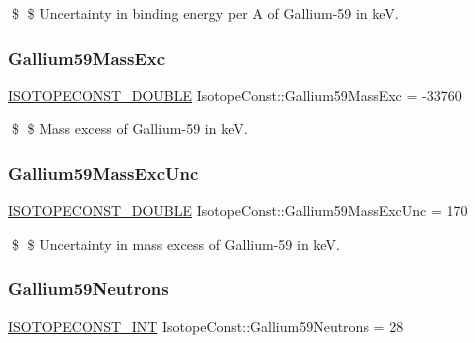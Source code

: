 \$ \$ Uncertainty in binding energy per A of Gallium-\/59 in keV. \mbox{\label{group___isotope_const-_gallium-_ga59_ga1356ecb63b396d3945ef4db6884b9479}} 
\subsubsection{\texorpdfstring{Gallium59\+Mass\+Exc}{Gallium59MassExc}}
{\footnotesize\ttfamily \mbox{\hyperlink{group___isotope_const-_macros_ga8f45a7272ce02c0b4c65c44636ed719a}{I\+S\+O\+T\+O\+P\+E\+C\+O\+N\+S\+T\+\_\+\+D\+O\+U\+B\+LE}} Isotope\+Const\+::\+Gallium59\+Mass\+Exc = -\/33760}

\$ \$ Mass excess of Gallium-\/59 in keV. \mbox{\label{group___isotope_const-_gallium-_ga59_ga3a3f208512d7182d0bef76e6c1239799}} 
\subsubsection{\texorpdfstring{Gallium59\+Mass\+Exc\+Unc}{Gallium59MassExcUnc}}
{\footnotesize\ttfamily \mbox{\hyperlink{group___isotope_const-_macros_ga8f45a7272ce02c0b4c65c44636ed719a}{I\+S\+O\+T\+O\+P\+E\+C\+O\+N\+S\+T\+\_\+\+D\+O\+U\+B\+LE}} Isotope\+Const\+::\+Gallium59\+Mass\+Exc\+Unc = 170}

\$ \$ Uncertainty in mass excess of Gallium-\/59 in keV. \mbox{\label{group___isotope_const-_gallium-_ga59_ga9fa4aea9d7c8603ef453491385b2478b}} 
\subsubsection{\texorpdfstring{Gallium59\+Neutrons}{Gallium59Neutrons}}
{\footnotesize\ttfamily \mbox{\hyperlink{group___isotope_const-_macros_ga5f18360b3e99483a35c32d789e62621c}{I\+S\+O\+T\+O\+P\+E\+C\+O\+N\+S\+T\+\_\+\+I\+NT}} Isotope\+Const\+::\+Gallium59\+Neutrons = 28}

